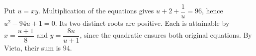 Put $u=xy$. Multiplication of the equations gives $u+2+\dfrac{1}{u}=96$, hence $u^2-94u+1=0$. Its two distinct roots are positive. Each is attainable by $x=\dfrac{u+1}{8}$ and $y=\dfrac{8u}{u+1}$, since the quadratic ensures both original equations. By Vieta, their sum is $\boxed{94}$.
